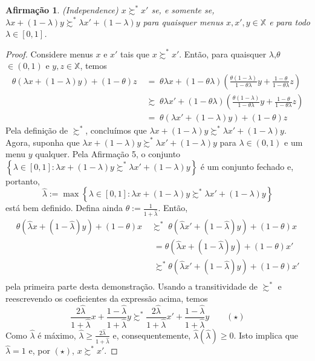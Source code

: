 \documentclass[11pt, a4paper]{article}
\theoremstyle{nonumberplain}
\newtheorem{proof}{Dem.}
\theoremstyle{plain}
\theoremstyle{plain}
\newtheorem{claim}{Afirmação}
\theoremstyle{plain}
\begin{document}
\begin{claim} (\textit{Independence}) $x\succsim^*x'$ se, e somente se, $\lambda x + (1-\lambda)y\succsim^* \lambda x' + (1-\lambda)y$ para quaisquer menus $x,x',y\in \mathbb{X}$ e para todo $\lambda \in [0,1]$.\end{claim}
\begin{proof}
Considere menus $x$ e $x'$ tais que $x\succsim^* x'$. Então, para quaisquer $\lambda$,$\theta$ $\in (0,1)$ e $y,z\in\mathbb{X}$, temos
\begin{align*}
\theta(\lambda x + (1-\lambda)y)+(1-\theta)z \;&=\; \theta\lambda x + (1-\theta\lambda)\left(\frac{\theta(1-\lambda)}{1-\theta\lambda}y+\frac{1-\theta}{1-\theta\lambda}z\right)\\
&\succsim\;  \theta\lambda x' + (1-\theta\lambda)\left(\frac{\theta(1-\lambda)}{1-\theta\lambda}y+\frac{1-\theta}{1-\theta\lambda}z\right)\\
&=\; \theta(\lambda x' + (1-\lambda)y)+(1-\theta)z
\end{align*}
Pela definição de $\succsim^*$, concluímos que $\lambda x + (1-\lambda)y\succsim^*\lambda x' + (1-\lambda)y$. 
Agora, suponha que $\lambda x + (1-\lambda)y\succsim^*\lambda x' + (1-\lambda)y$ para $\lambda\in(0,1)$ e um menu $y$ qualquer. Pela Afirmação 5, o conjunto $\left\{\lambda\in[0,1]:\lambda x + (1-\lambda)y\succsim^*\lambda x' + (1-\lambda)y\right\}$ é um conjunto fechado e, portanto, $$\hat{\lambda}:=\max\left\{\lambda\in[0,1]:\lambda x + (1-\lambda)y\succsim^*\lambda x' + (1-\lambda)y\right\}$$ está bem definido. Defina ainda $\theta:=\frac{1}{1+\hat{\lambda}}$. Então,
\begin{align*}
\theta(\hat{\lambda}x+(1-\hat{\lambda})y)+(1-\theta)x\;&\succsim^*\;\theta(\hat{\lambda}x'+(1-\hat{\lambda})y)+(1-\theta)x\\
&\;= \theta(\hat{\lambda}x+(1-\hat{\lambda})y)+(1-\theta)x'\\
&\;\succsim^* \theta(\hat{\lambda}x'+(1-\hat{\lambda})y)+(1-\theta)x'\\  
\end{align*} pela primeira parte desta demonstração. Usando a transitividade de $\succsim^*$ e reescrevendo os coeficientes da expressão acima, temos $$\frac{2\hat{\lambda}}{1+\hat{\lambda}}x+\frac{1-\hat{\lambda}}{1+\hat{\lambda}}y \succsim^* \frac{2\hat{\lambda}}{1+\hat{\lambda}}x'+\frac{1-\hat{\lambda}}{1+\hat{\lambda}}y \qquad (\star)$$ Como $\hat{\lambda}$ é máximo, $\hat{\lambda}\geq \frac{2\hat{\lambda}}{1+\hat{\lambda}}$ e, consequentemente, $\hat{\lambda}(\hat{\lambda})\geq 0$. Isto implica que $\hat{\lambda}=1$ e, por $(\star)$, $x\succsim^* x'$.
\end{proof}
\end{document}
